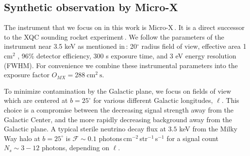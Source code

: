\documentclass[aps,prd,10pt,twocolumn,superscriptaddress,showpacs]{revtex4-1}
\newcommand{\units}[1]{~\mathrm{#1}}
\begin{document}



\subsection{Synthetic observation by Micro-X}
\label{sec:microx}

The instrument that we focus on in this work is Micro-X\,\cite{Figueroa-Feliciano:2015gwa}.  It is a
direct successor to the XQC sounding rocket
experiment\,\cite{McCammon:2002gb,Boyarsky:2006hr,Crowder:2012ts}.  We follow the parameters of the
instrument near 3.5 keV as mentioned in\,\cite{Figueroa-Feliciano:2015gwa}: 20$^\circ$ radius field
of view, effective area 1 cm$^2$ , 96\% detector efficiency, 300 s exposure time, and 3 eV
energy resolution (FWHM). For convenience we combine these instrumental parameters into the exposure factor
$O_{MX}=288\units{cm^2~s}$.

To minimize contamination by the Galactic plane, we focus on fields of view which are centered at $b = 25^\circ$ for various different Galactic longitudes, $\ell$.  This choice is a compromise between the decreasing signal strength away from the Galactic Center, and the more rapidly decreasing background away from the Galactic plane.  A typical sterile neutrino decay flux at $3.5$ keV from
the Milky Way halo at $b=25^\circ$ is $\mathcal{F}\sim 0.1$ photons\,cm$^{-2}$\,str$^{-1}$\,s$^{-1}$ 
for a signal count $N_s \sim 3-12$ photons, depending on $\ell$. 
\end{document}
